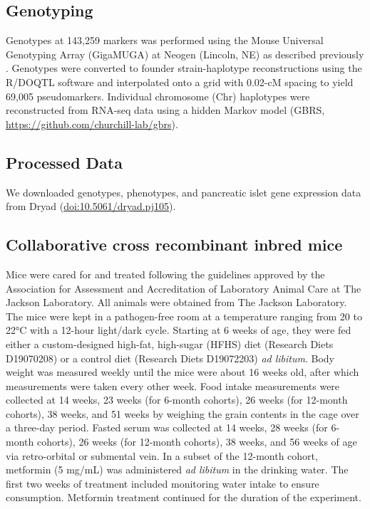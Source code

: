 \documentclass[
]{article}
\begin{document}
\subsection{Genotyping}\label{genotyping}

Genotypes at 143,259 markers was performed using the Mouse Universal
Genotyping Array (GigaMUGA) \cite{pmid26684931} at Neogen (Lincoln, NE)
as described previously \cite{pmid29567659, pmid22345611}. Genotypes
were converted to founder strain-haplotype reconstructions using the
R/DOQTL software \cite{pmid25237114} and interpolated onto a grid with
0.02-cM spacing to yield 69,005 pseudomarkers. Individual chromosome
(Chr) haplotypes were reconstructed from RNA-seq data using a hidden
Markov model (GBRS, \url{https://github.com/churchill-lab/gbrs}).

\subsection{Processed Data}\label{processed-data}

We downloaded genotypes, phenotypes, and pancreatic islet gene
expression data from Dryad (\url{doi:10.5061/dryad.pj105}).

\subsection{Collaborative cross recombinant inbred
mice}\label{collaborative-cross-recombinant-inbred-mice}

Mice were cared for and treated following the guidelines approved by the
Association for Assessment and Accreditation of Laboratory Animal Care
at The Jackson Laboratory. All animals were obtained from The Jackson
Laboratory. The mice were kept in a pathogen-free room at a temperature
ranging from 20 to 22°C with a 12-hour light/dark cycle. Starting at 6
weeks of age, they were fed either a custom-designed high-fat,
high-sugar (HFHS) diet (Research Diets D19070208) or a control diet
(Research Diets D19072203) \textit{ad libitum}. Body weight was measured
weekly until the mice were about 16 weeks old, after which measurements
were taken every other week. Food intake measurements were collected at
14 weeks, 23 weeks (for 6-month cohorts), 26 weeks (for 12-month
cohorts), 38 weeks, and 51 weeks by weighing the grain contents in the
cage over a three-day period. Fasted serum was collected at 14 weeks, 28
weeks (for 6-month cohorts), 26 weeks (for 12-month cohorts), 38 weeks,
and 56 weeks of age via retro-orbital or submental vein. In a subset of
the 12-month cohort, metformin (5 mg/mL) was administered
\textit{ad libitum} in the drinking water. The first two weeks of
treatment included monitoring water intake to ensure consumption.
Metformin treatment continued for the duration of the experiment.
\end{document}
